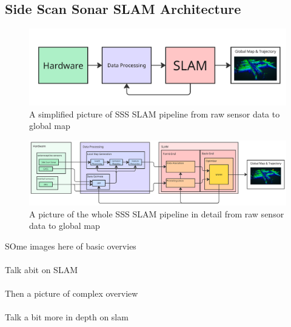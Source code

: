 \subsection{Side Scan Sonar SLAM Architecture}
\begin{figure}[H]
    \centering
    \includegraphics[width=1.0\linewidth]{Pictures/Introduction/SSS_SLAM_Architecture/Simplified.png}
    \caption{A simplified picture of SSS SLAM pipeline from raw sensor data to global map}
    \label{fig:SSS-SLAM-Architecture-Simplified}
\end{figure}
\begin{figure}[H]
    \centering
    \includegraphics[width=1.0\linewidth]{Pictures/Introduction/SSS_SLAM_Architecture/Full.png}
    \caption{A picture of the whole SSS SLAM pipeline in detail from raw sensor data to global map}
    \label{fig:SSS-SLAM-Architecture-Full}
\end{figure}
\noindent
SOme images here of basic overvies
\\ \\
Talk abit on SLAM
\\ \\
Then a picture of complex overview
\\ \\
Talk a bit more in depth on slam